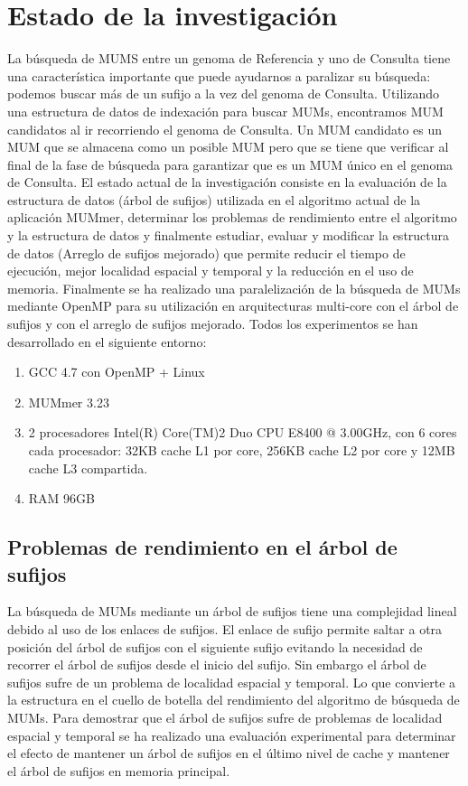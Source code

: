 \documentclass[12pt,a4paper]{article}
\begin{document}
\section{Estado de la investigación}
La búsqueda de MUMS entre un genoma de Referencia y uno de Consulta tiene una característica importante que puede ayudarnos a paralizar su búsqueda: podemos buscar más de un sufijo a la vez del genoma de Consulta. Utilizando una estructura de datos de indexación para buscar MUMs, encontramos MUM candidatos al ir recorriendo el genoma de Consulta. Un MUM candidato es un MUM que se almacena como un posible MUM pero que se tiene que verificar al final de la fase de búsqueda para garantizar que es un MUM único en el genoma de Consulta.
El estado actual de la investigación consiste en la evaluación de la estructura de datos (árbol de sufijos) utilizada en el algoritmo actual de la aplicación MUMmer, determinar los problemas de rendimiento entre el algoritmo y la estructura de datos y finalmente estudiar, evaluar y modificar la estructura de datos (Arreglo de sufijos mejorado) que permite reducir el tiempo de ejecución, mejor localidad espacial y temporal y la reducción en el uso de memoria.
Finalmente se ha realizado una paralelización de la búsqueda de MUMs mediante OpenMP para su utilización en arquitecturas multi-core con el árbol de sufijos y con el arreglo de sufijos mejorado.
Todos los experimentos se han desarrollado en el siguiente entorno:
\begin{enumerate}
\item GCC 4.7 con OpenMP + Linux
\item MUMmer 3.23
\item 2 procesadores Intel(R) Core(TM)2 Duo CPU     E8400  @ 3.00GHz, con 6 cores cada procesador: 32KB cache L1 por core, 256KB cache L2 por core y 12MB cache L3 compartida.
\item RAM 96GB
\end{enumerate}
\subsection{Problemas de rendimiento en el árbol de sufijos}
La búsqueda de MUMs mediante un árbol de sufijos tiene una complejidad lineal debido al uso de los enlaces de sufijos. El enlace de sufijo permite saltar a otra posición del árbol de sufijos con el siguiente sufijo evitando la necesidad de recorrer el árbol de sufijos desde el inicio del sufijo. 
Sin embargo el árbol de sufijos sufre de un problema de localidad espacial y temporal. Lo que convierte a la estructura en el cuello de botella del rendimiento del algoritmo de búsqueda de MUMs.
Para demostrar que el árbol de sufijos sufre de problemas de localidad espacial y temporal se ha realizado una evaluación experimental para determinar el efecto de mantener un árbol de sufijos en el último nivel de cache y mantener el árbol de sufijos en memoria principal.
\end{document}
